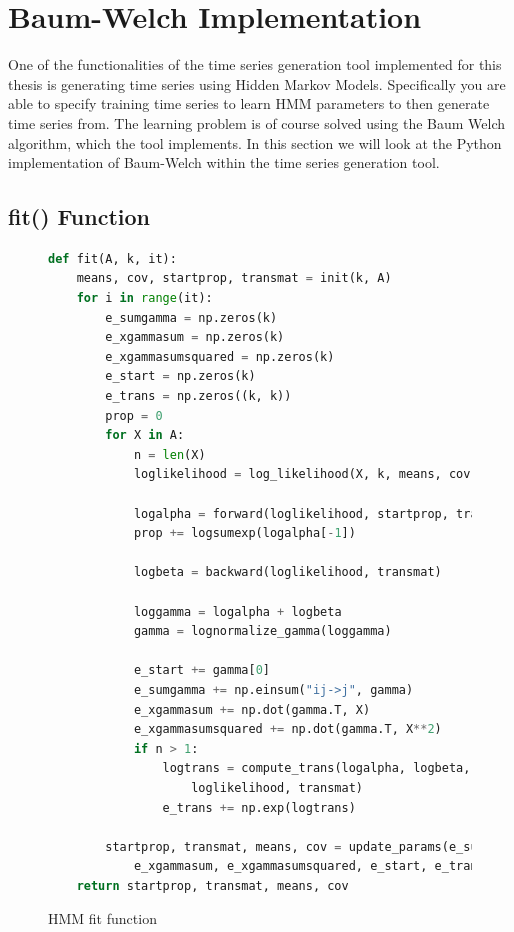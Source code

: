 
\chapter{Baum-Welch Implementation}\label{chapter:hmm-impl}

One of the functionalities of the time series generation tool implemented for this thesis is generating time series using Hidden Markov Models. Specifically you are able to specify training time series to learn HMM parameters to then generate time series from. The learning problem is of course solved using the Baum Welch algorithm, which the tool implements. In this section we will look at the Python implementation of Baum-Welch within the time series generation tool. 

\section{fit() Function}

\begin{figure}
\begin{singlespace}
\begin{lstlisting}[language=Python]
def fit(A, k, it):
    means, cov, startprop, transmat = init(k, A)
    for i in range(it):
        e_sumgamma = np.zeros(k)
        e_xgammasum = np.zeros(k)
        e_xgammasumsquared = np.zeros(k)
        e_start = np.zeros(k)
        e_trans = np.zeros((k, k))
        prop = 0
        for X in A:
            n = len(X)
            loglikelihood = log_likelihood(X, k, means, cov)

            logalpha = forward(loglikelihood, startprop, transmat)
            prop += logsumexp(logalpha[-1])

            logbeta = backward(loglikelihood, transmat)

            loggamma = logalpha + logbeta
            gamma = lognormalize_gamma(loggamma)

            e_start += gamma[0]
            e_sumgamma += np.einsum("ij->j", gamma)
            e_xgammasum += np.dot(gamma.T, X)
            e_xgammasumsquared += np.dot(gamma.T, X**2)
            if n > 1:
                logtrans = compute_trans(logalpha, logbeta, \
                    loglikelihood, transmat)
                e_trans += np.exp(logtrans)

        startprop, transmat, means, cov = update_params(e_sumgamma, \
            e_xgammasum, e_xgammasumsquared, e_start, e_trans)
    return startprop, transmat, means, cov
\end{lstlisting}
\end{singlespace}
   
\caption{HMM fit function}    
\label{fig:hmm-fit-listing}
\end{figure}


